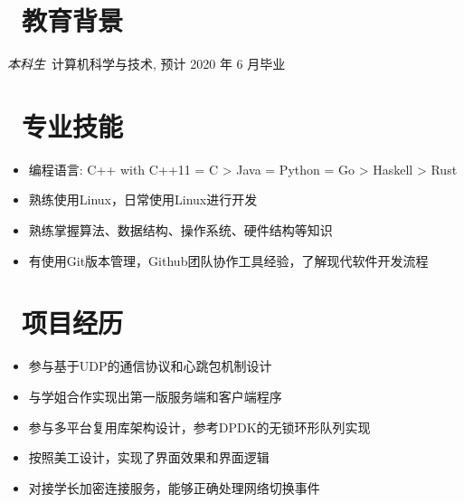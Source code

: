 \documentclass{resume}
\begin{document}



\section{\texorpdfstring{\faGraduationCap\ 教育背景}{教育背景}}
\textit{本科生}\ 计算机科学与技术, 预计 2020 年 6 月毕业

\section{\texorpdfstring{\faCogs\ 专业技能}{专业技能}}
\begin{itemize}[parsep=0.5ex]
  \item 编程语言: C++ with C++11 = C > Java = Python = Go > Haskell > Rust
  \item 熟练使用Linux，日常使用Linux进行开发
  \item 熟练掌握算法、数据结构、操作系统、硬件结构等知识
  \item 有使用Git版本管理，Github团队协作工具经验，了解现代软件开发流程
\end{itemize}

\section{\texorpdfstring{\faUsers\ 项目经历}{项目经历}}
\begin{itemize}
  \item 参与基于UDP的通信协议和心跳包机制设计
  \item 与学姐合作实现出第一版服务端和客户端程序
  \item 参与多平台复用库架构设计，参考DPDK的无锁环形队列实现
\end{itemize}

\begin{itemize}
  \item 按照美工设计，实现了界面效果和界面逻辑
  \item 对接学长加密连接服务，能够正确处理网络切换事件
\end{itemize}
\end{document}
